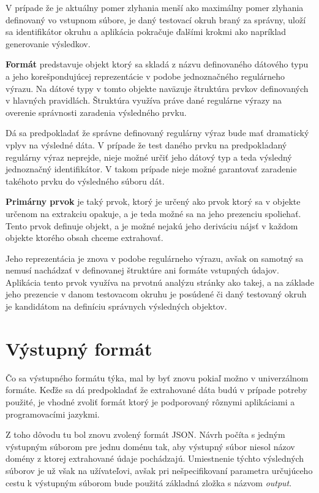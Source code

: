 V prípade že je aktuálny pomer zlyhania menší ako maximálny pomer zlyhania definovaný vo vstupnom súbore, je daný testovací okruh braný za správny, uloží sa identifikátor okruhu a aplikácia pokračuje ďalšími krokmi ako napríklad generovanie výsledkov.

\bigskip

\textbf{Formát} predstavuje objekt ktorý sa skladá z názvu definovaného dátového typu a jeho korešpondujúcej reprezentácie v podobe jednoznačného regulárneho výrazu. Na dátové typy v tomto objekte naväzuje štruktúra prvkov definovaných v hlavných pravidlách. Štruktúra využíva práve dané regulárne výrazy na overenie správnosti zaradenia výsledného prvku.

Dá sa predpokladať že správne definovaný regulárny výraz bude mať dramatický vplyv na výsledné dáta. V prípade že test daného prvku na predpokladaný regulárny výraz neprejde, nieje možné určiť jeho dátový typ a teda výsledný jednoznačný identifikátor. V takom prípade nieje možné garantovať zaradenie takéhoto prvku do výsledného súboru dát.

\bigskip

\textbf{Primárny prvok} je taký prvok, ktorý je určený ako prvok ktorý sa v objekte určenom na extrakciu opakuje, a je teda možné sa na jeho prezenciu spoliehať. Tento prvok definuje objekt, a je možné nejakú jeho deriváciu nájsť v každom objekte ktorého obsah chceme extrahovať. 

Jeho reprezentácia je znova v podobe regulárneho výrazu, avšak on samotný sa nemusí nachádzať v definovanej štruktúre ani formáte vstupných údajov. Aplikácia tento prvok využíva na prvotnú analýzu stránky ako takej, a na základe jeho prezencie v danom testovacom okruhu je posúdené či daný testovaný okruh je kandidátom na definíciu správnych výsledných objektov.

\newpage
\section{Výstupný formát}

Čo sa výstupného formátu týka, mal by byť znovu pokiaľ možno v univerzálnom formáte. Keďže sa dá predpokladať že extrahované dáta budú v prípade potreby použité, je vhodné zvoliť formát ktorý je podporovaný rôznymi aplikáciami a programovacími jazykmi.

Z toho dôvodu tu bol znovu zvolený formát JSON. Návrh počíta s jedným výstupným súborom pre jednu doménu tak, aby výstupný súbor niesol názov domény z ktorej extrahované údaje pochádzajú. Umiestnenie týchto výsledných súborov je už však na užívateľovi, avšak pri nešpecifikovaní parametra určujúceho cestu k výstupným súborom bude použitá základná zložka s názvom \textit{output}.

